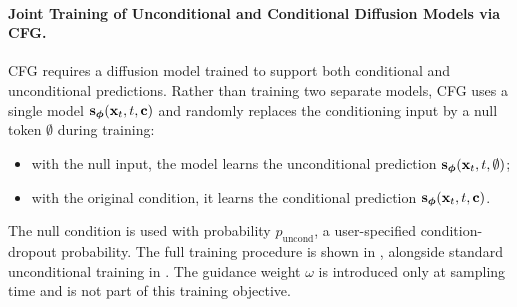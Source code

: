 \paragraph{Joint Training of Unconditional and Conditional Diffusion Models via CFG.}
CFG requires a diffusion model trained to support both conditional and
unconditional predictions. Rather than training two separate models, CFG uses
a single model ${\mathbf{s}}_{\bm{\phi}}({\mathbf{x}}_t,t,{\mathbf{c}})$ and randomly replaces the
conditioning input by a null token $\emptyset$ during training:
\begin{itemize}
    \item with the null input, the model learns the unconditional prediction
    ${\mathbf{s}}_{\bm{\phi}}({\mathbf{x}}_t,t,\emptyset)$;
    \item with the original condition, it learns the conditional prediction
    ${\mathbf{s}}_{\bm{\phi}}({\mathbf{x}}_t,t,{\mathbf{c}})$.
\end{itemize}
The null condition is used with probability $p_\mathrm{uncond}$, a
user-specified condition-dropout probability. The full training procedure is
shown in , alongside standard unconditional training in
. The guidance weight $\omega$ is introduced only
at sampling time and is not part of this training objective.

